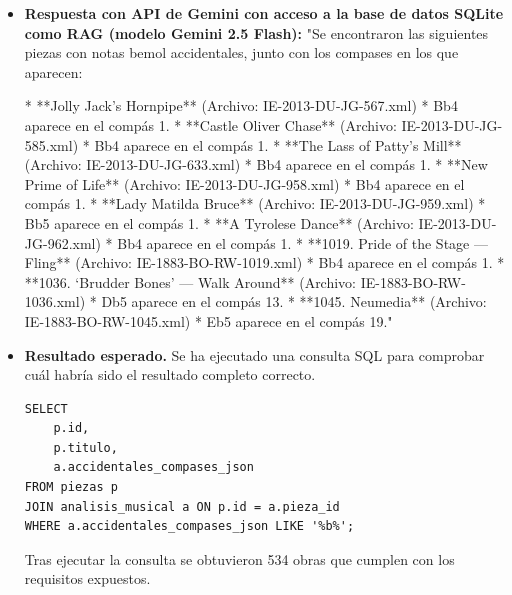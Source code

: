 \begin{itemize}
Aquí te presento la lista completa de las notas con bemoles accidentales:

| Compás | Medida | Nota | Alteración |
| --- | --- | --- | --- |
| 2 | 189 | F | +1 (en realidad un si bemol) |
| 4 | 146 | B | +1 (en realidad un si bemol) |

Es importante mencionar que en el archivo MEI proporcionado, los bemoles accidentales están representados como `+1` y no como `\#\#`. Esto podría causar confusión al interpretar la música."
\item \textbf{Respuesta con API de Gemini con acceso a la base de datos SQLite como RAG (modelo Gemini 2.5 Flash):} "Se encontraron las siguientes piezas con notas bemol accidentales, junto con los compases en los que aparecen:

*   **Jolly Jack’s Hornpipe** (Archivo: IE-2013-DU-JG-567.xml)
    *   Bb4 aparece en el compás 1.
*   **Castle Oliver Chase** (Archivo: IE-2013-DU-JG-585.xml)
    *   Bb4 aparece en el compás 1.
*   **The Lass of Patty’s Mill** (Archivo: IE-2013-DU-JG-633.xml)
    *   Bb4 aparece en el compás 1.
*   **New Prime of Life** (Archivo: IE-2013-DU-JG-958.xml)
    *   Bb4 aparece en el compás 1.
*   **Lady Matilda Bruce** (Archivo: IE-2013-DU-JG-959.xml)
    *   Bb5 aparece en el compás 1.
*   **A Tyrolese Dance** (Archivo: IE-2013-DU-JG-962.xml)
    *   Bb4 aparece en el compás 1.
*   **1019. Pride of the Stage — Fling** (Archivo: IE-1883-BO-RW-1019.xml)
    *   Bb4 aparece en el compás 1.
*   **1036. ‘Brudder Bones’ — Walk Around** (Archivo: IE-1883-BO-RW-1036.xml)
    *   Db5 aparece en el compás 13.
*   **1045. Neumedia** (Archivo: IE-1883-BO-RW-1045.xml)
    *   Eb5 aparece en el compás 19."
    \item \textbf{Resultado esperado.} Se ha ejecutado una consulta SQL para comprobar cuál habría sido el resultado completo correcto.
    \begin{verbatim}
SELECT 
    p.id,
    p.titulo,
    a.accidentales_compases_json
FROM piezas p
JOIN analisis_musical a ON p.id = a.pieza_id
WHERE a.accidentales_compases_json LIKE '%b%';
    \end{verbatim}    
    Tras ejecutar la consulta se obtuvieron 534 obras que cumplen con los requisitos expuestos.


\end{itemize}

